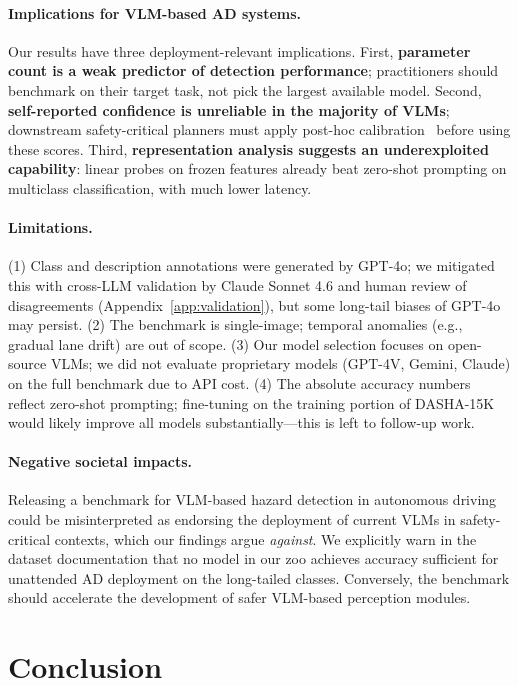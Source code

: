 \documentclass{article}
\newcommand{\bench}{\textsc{DASHA-15K}\xspace}
\begin{document}
\paragraph{Implications for VLM-based AD systems.}
Our results have three deployment-relevant implications. First,
\textbf{parameter count is a weak predictor of detection performance};
practitioners should benchmark on their target task, not pick the
largest available model. Second, \textbf{self-reported confidence is
unreliable in the majority of VLMs}; downstream safety-critical
planners must apply post-hoc calibration~\citep{vl_calibration} before
using these scores. Third, \textbf{representation analysis suggests an
underexploited capability}: linear probes on frozen features already
beat zero-shot prompting on multiclass classification, with much
lower latency.

\paragraph{Limitations.}
(1) Class and description annotations were generated by GPT-4o; we
mitigated this with cross-LLM validation by Claude Sonnet 4.6 and
human review of disagreements (Appendix~\ref{app:validation}), but
some long-tail biases of GPT-4o may persist. (2) The benchmark is
single-image; temporal anomalies (e.g., gradual lane drift) are out of
scope. (3) Our model selection focuses on open-source VLMs; we did
not evaluate proprietary models (GPT-4V, Gemini, Claude) on the full
benchmark due to API cost. (4) The absolute accuracy numbers reflect
zero-shot prompting; fine-tuning on the training portion of \bench
would likely improve all models substantially---this is left to
follow-up work.

\paragraph{Negative societal impacts.}
Releasing a benchmark for VLM-based hazard detection in autonomous
driving could be misinterpreted as endorsing the deployment of
current VLMs in safety-critical contexts, which our findings argue
\emph{against}. We explicitly warn in the dataset documentation that
no model in our zoo achieves accuracy sufficient for unattended AD
deployment on the long-tailed classes. Conversely, the benchmark
should accelerate the development of safer VLM-based perception
modules.

\section{Conclusion}
\label{sec:conclusion}
\end{document}
